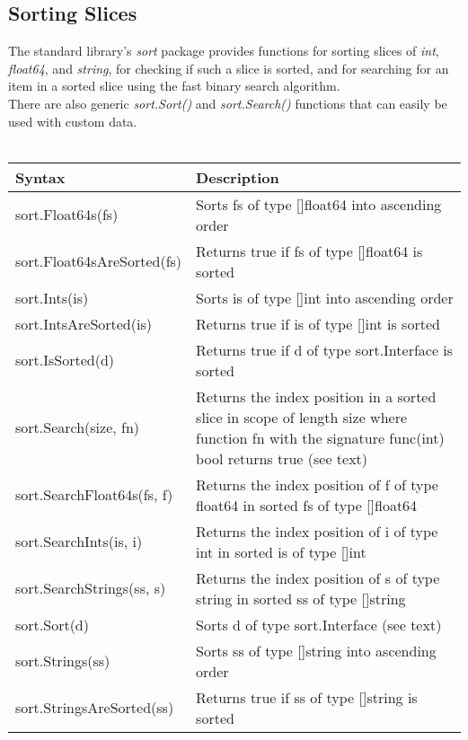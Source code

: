 \documentclass[10pt,letterpaper]{report}
\begin{document}
\subsection{Sorting Slices}
The standard library's \textit{sort} package provides functions for sorting slices of \textit{int}, \textit{float64}, and \textit{string}, for checking if such a slice is sorted, and for searching for an item in a sorted slice using the fast binary search algorithm.\\
There are also generic \textit{sort.Sort()} and \textit{sort.Search()} functions that can easily be used with custom data.\\
\\
\begin{tabular}{|l|p{8cm}|}
\hline
Syntax & Description\\ \hline
sort.Float64s(fs) & Sorts fs of type []float64 into ascending order\\ \hline
sort.Float64sAreSorted(fs) & Returns true if fs of type []float64 is sorted\\ \hline
sort.Ints(is) & Sorts is of type []int into ascending order\\ \hline
sort.IntsAreSorted(is) & Returns true if is of type []int is sorted\\ \hline
sort.IsSorted(d) & Returns true if d of type sort.Interface is sorted\\ \hline
sort.Search(size, fn) & Returns the index position in a sorted slice in scope of length size where function fn with the signature func(int) bool returns true (see text)\\ \hline
sort.SearchFloat64s(fs, f) & Returns the index position of f of type float64 in sorted fs of type []float64\\ \hline
sort.SearchInts(is, i) & Returns the index position of i of type int in sorted is of type []int\\ \hline
sort.SearchStrings(ss, s) & Returns the index position of s of type string in sorted ss of type []string\\ \hline
sort.Sort(d) & Sorts d of type sort.Interface (see text)\\ \hline
sort.Strings(ss) & Sorts ss of type []string into ascending order\\ \hline
sort.StringsAreSorted(ss) & Returns true if ss of type []string is sorted\\ \hline
\end{tabular}
\\
\end{document}
